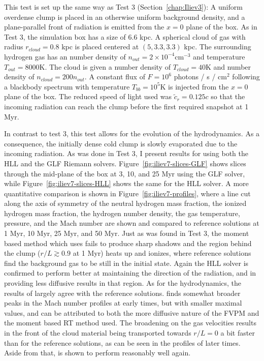 This test is set up the same way as Test 3 (Section~\ref{chap:Iliev3}): A uniform overdense clump
is placed in an otherwise uniform background density, and a plane-parallel front of radiation is
emitted from the $x = 0$ plane of the box. As in Test 3, the simulation box has a size of $6.6$ kpc.
A spherical cloud of gas with radius $r_{cloud} = 0.8$ kpc is placed centered at $(5, 3.3, 3.3)$
kpc. The surrounding hydrogen gas has an number density of $n_{out} = 2 \times 10^{-4}$cm$^{-3}$ and
temperature $T_{out} = 8000$K. The cloud is given a number density of $T_{cloud} = 40$K and number
density of $n_{cloud} = 200 n_{out}$. A constant flux of $F = 10^6$ photons / s / cm$^2$ following a
blackbody spectrum with temperature $T_{bb} = 10^{5}$K is injected from the $x = 0$ plane of the
box. The reduced speed of light used was $\tilde{c}_r = 0.125 c$ so that the incoming radiation can
reach the clump before the first required snapshot at 1 Myr.

In contrast to test 3, this test allows for the evolution of the hydrodynamics. As a consequence,
the initially dense cold clump is slowly evaporated due to the incoming radiation. As was done in
Test 3, I present results for \GEARRT using both the HLL and the GLF Riemann solvers.
Figure~\ref{fig:iliev7-slices-GLF} shows slices through the mid-plane of the box at 3, 10, and 25
Myr using the GLF solver, while Figure~\ref{fig:iliev7-slices-HLL} shows the same for the HLL
solver. A more quantitative comparison is shown in Figure~\ref{fig:iliev7-profiles}, where a line
cut along the axis of symmetry of the neutral hydrogen mass fraction, the ionized hydrogen mass
fraction, the hydrogen number density, the gas temperature, pressure, and the Mach number are shown
and compared to reference solutions at 1 Myr, 10 Myr, 25 Myr, and 50 Myr. Just as was found in Test
3, the moment based method which \GEARRT uses fails to produce sharp shadows and the region behind
the clump ($r/L \gtrsim 0.9$ at 1 Myr) heats up and ionizes, where reference solutions find the
background gas to be still in the initial state. Again the HLL solver is confirmed to perform better
at maintaining the direction of the radiation, and in providing less diffusive results in that
region. As for the hydrodynamics, the results of \GEARRT largely agree with the reference solutions.
\GEARRT finds somewhat broader peaks in the Mach number profiles at early times, but with smaller
maximal values, and can be attributed to both the more diffusive nature of the FVPM and the moment
based RT method used. The broadening on the gas velocities results in the front of the cloud
material being transported towards $r/L = 0$ a bit faster than for the reference solutions, as can
be seen in the profiles of later times. Aside from that, \GEARRT is shown to perform reasonably well
again.

















